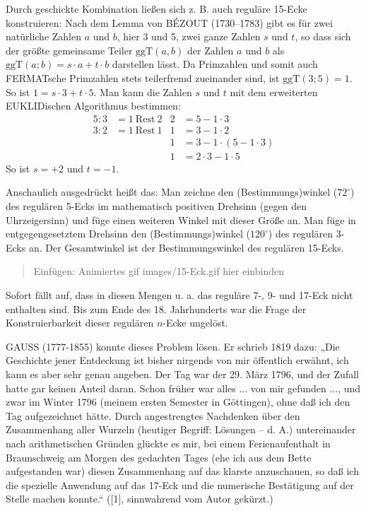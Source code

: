 \documentclass[11pt]{article}
\newcommand{\ggT}{\mathrm{ggT}}
\newcommand{\HGG}[1]{\begin{quote} Einfügen: #1 \end{quote}}
\begin{document}
Durch geschickte Kombination ließen sich z. B. auch reguläre 15-Ecke
konstruieren: Nach dem Lemma von BÉZOUT (1730--1783) gibt es für zwei
natürliche Zahlen $a$ und $b$, hier 3 und 5, zwei ganze Zahlen $s$ und $t$, so
dass sich der größte gemeinsame Teiler $\mathrm{ggT}(a,b)$ der Zahlen $a$ und
$b$ als $\ggT(a;b) = s \cdot a + t \cdot b$ darstellen lässt. Da Primzahlen
und somit auch FERMATsche Primzahlen stets teilerfremd zueinander sind, ist
$\ggT(3; 5) = 1$. So ist $1 = s \cdot 3 + t \cdot 5$. Man kann die Zahlen $s$
und $t$ mit dem erweiterten EUKLIDischen Algorithmus bestimmen:
\begin{align*}  
  5 : 3 &= 1\ \text{Rest}\ 2 & 	2 &= 5 - 1 \cdot 3\\{}
  3 : 2 &= 1\ \text{Rest}\ 1 &	1 &= 3 - 1 \cdot 2\\{}
  && 1 &= 3 - 1 \cdot (5 - 1 \cdot 3)\\{}
  && 1 &= 2 \cdot 3 - 1 \cdot 5
\end{align*}
So ist $s = +2$ und $t = -1$.

Anschaulich ausgedrückt heißt das: Man zeichne den (Bestimmungs)winkel
($72^\circ$) des regulären 5-Ecks im mathematisch positiven Drehsinn (gegen
den Uhrzeigersinn) und füge einen weiteren Winkel mit dieser Größe an. Man
füge in entgegengesetztem Drehsinn den (Bestimmungs)winkel ($120^\circ$) des
regulären 3-Ecks an. Der Gesamtwinkel ist der Bestimmungswinkel des regulären
15-Ecks.

\HGG{Animiertes gif images/15-Eck.gif hier einbinden}

Sofort fällt auf, dass in diesen Mengen u. a. das reguläre 7-, 9- und 17-Eck
nicht enthalten sind. Bis zum Ende des 18. Jahrhunderts war die Frage der
Konstruierbarkeit dieser regulären $n$-Ecke ungelöst.

GAUSS (1777-1855) konnte dieses Problem lösen. Er schrieb 1819 dazu: „Die
Geschichte jener Entdeckung ist bisher nirgends von mir öffentlich erwähnt,
ich kann es aber sehr genau angeben. Der Tag war der 29. März 1796, und der
Zufall hatte gar keinen Anteil daran. Schon früher war alles ... von mir
gefunden ..., und zwar im Winter 1796 (meinem ersten Semester in Göttingen),
ohne daß ich den Tag aufgezeichnet hätte. Durch angestrengtes Nachdenken über
den Zusammenhang aller Wurzeln (heutiger Begriff: Lösungen -- d. A.)
untereinander nach arithmetischen Gründen glückte es mir, bei einem
Ferienaufenthalt in Braunschweig am Morgen des gedachten Tages (ehe ich aus
dem Bette aufgestanden war) diesen Zusammenhang auf das klarste anzuschauen,
so daß ich die spezielle Anwendung auf das 17-Eck und die numerische
Bestätigung auf der Stelle machen konnte.“ ([1], sinnwahrend vom Autor
gekürzt.)
\end{document}
